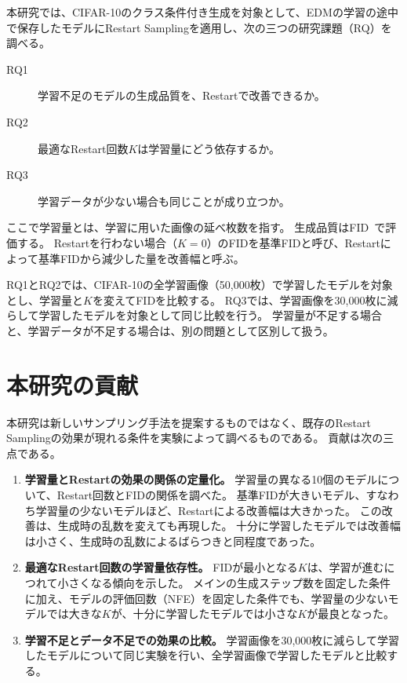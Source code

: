 本研究では、CIFAR-10のクラス条件付き生成を対象として、EDMの学習の途中で保存したモデルにRestart Samplingを適用し、次の三つの研究課題（RQ）を調べる。

\begin{description}
  \item[RQ1] 学習不足のモデルの生成品質を、Restartで改善できるか。
  \item[RQ2] 最適なRestart回数$K$は学習量にどう依存するか。
  \item[RQ3] 学習データが少ない場合も同じことが成り立つか。
\end{description}

ここで学習量とは、学習に用いた画像の延べ枚数を指す。
生成品質はFID~\cite{heusel2017fid}で評価する。
Restartを行わない場合（$K=0$）のFIDを基準FIDと呼び、Restartによって基準FIDから減少した量を改善幅と呼ぶ。

RQ1とRQ2では、CIFAR-10の全学習画像（50,000枚）で学習したモデルを対象とし、学習量と$K$を変えてFIDを比較する。
RQ3では、学習画像を30,000枚に減らして学習したモデルを対象として同じ比較を行う。
学習量が不足する場合と、学習データが不足する場合は、別の問題として区別して扱う。

\section{本研究の貢献}
\label{sec:intro-contributions}

本研究は新しいサンプリング手法を提案するものではなく、既存のRestart Samplingの効果が現れる条件を実験によって調べるものである。
貢献は次の三点である。

\begin{enumerate}
  \item \textbf{学習量とRestartの効果の関係の定量化。}
    学習量の異なる10個のモデルについて、Restart回数とFIDの関係を調べた。
    基準FIDが大きいモデル、すなわち学習量の少ないモデルほど、Restartによる改善幅は大きかった。
    この改善は、生成時の乱数を変えても再現した。
    十分に学習したモデルでは改善幅は小さく、生成時の乱数によるばらつきと同程度であった。
  \item \textbf{最適なRestart回数の学習量依存性。}
    FIDが最小となる$K$は、学習が進むにつれて小さくなる傾向を示した。
    メインの生成ステップ数を固定した条件に加え、モデルの評価回数（NFE）を固定した条件でも、学習量の少ないモデルでは大きな$K$が、十分に学習したモデルでは小さな$K$が最良となった。
  \item \textbf{学習不足とデータ不足での効果の比較。}
    学習画像を30,000枚に減らして学習したモデルについて同じ実験を行い、全学習画像で学習したモデルと比較する。
\end{enumerate}

